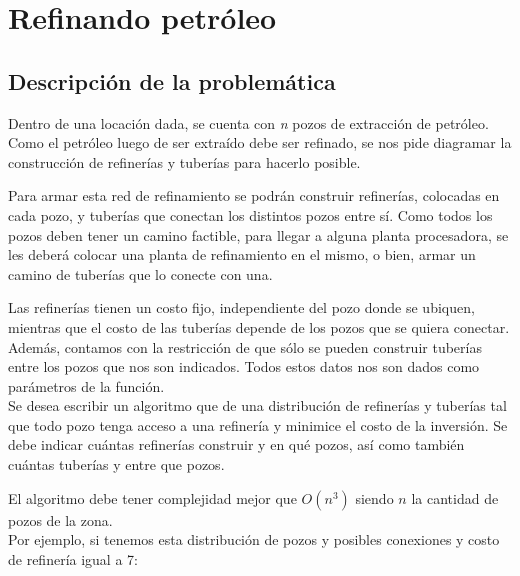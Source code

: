 \section{Refinando petr\'oleo}
\subsection{Descripci\'on de la problem\'atica}

Dentro de una locaci\'on dada, se cuenta con \emph{n} pozos de extracci\'on de petr\'oleo. Como el petr\'oleo luego de ser extra\'ido debe ser refinado, se nos pide diagramar la construcci\'on de refiner\'ias y tuber\'ias para hacerlo posible.

Para armar esta red de refinamiento se podr\'an construir refiner\'ias, colocadas en cada pozo, y tuber\'ias que conectan los distintos pozos entre s\'i. Como todos los pozos deben tener un camino factible, para llegar a alguna planta procesadora, se les deber\'a colocar una planta de refinamiento en el mismo, o bien, armar un camino de tuber\'ias que lo conecte con una.
 
	Las refiner\'ias tienen un costo fijo, independiente del pozo donde se ubiquen, mientras que el costo de las tuber\'ias depende de los pozos que se quiera conectar. Adem\'as, contamos con la restricci\'on de que s\'olo se pueden construir tuber\'ias entre los pozos que nos son indicados. Todos estos datos nos son dados como par\'ametros de la funci\'on.\\

	Se desea escribir un algoritmo que de una distribuci\'on de refiner\'ias y tuber\'ias tal que todo pozo tenga acceso a una refiner\'ia y minimice el costo de la inversi\'on. Se debe indicar cu\'antas refiner\'ias construir y en qu\'e pozos, as\'i como tambi\'en cu\'antas tuber\'ias y entre que pozos.

	El algoritmo debe tener complejidad mejor que $O(n^3)$ siendo $n$ la cantidad de pozos de la zona.\\

	Por ejemplo, si tenemos esta distribuci\'on de pozos y posibles conexiones y costo de refiner\'ia igual a 7:

